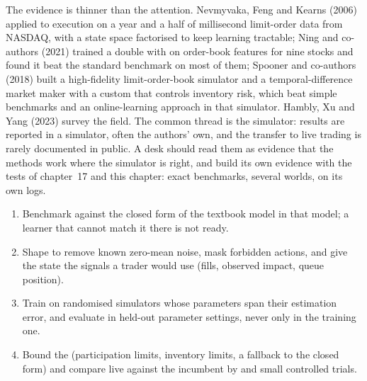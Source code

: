 The evidence is thinner than the attention. Nevmyvaka, Feng and Kearns (2006) applied  to execution on
a year and a half of millisecond limit-order data from NASDAQ, with a state space factorised to keep learning tractable;
Ning and co-authors (2021) trained a double  with  on order-book features for nine stocks and
found it beat the standard benchmark on most of them; Spooner and co-authors
(2018) built a high-fidelity limit-order-book simulator and a temporal-difference market maker with a custom  that
controls inventory risk, which beat simple benchmarks and an online-learning approach in that simulator. Hambly, Xu and Yang
(2023) survey the field. The common thread is the simulator: results are reported in a simulator, often the authors' own, and
the transfer to live trading is rarely documented in public. A desk should read them as evidence that the methods work where
the simulator is right, and build its own evidence with the tests of chapter~17 and this chapter: exact benchmarks, several
worlds,  on its own logs.

\begin{method}\label{met:ml:rlt:method}
\begin{enumerate}
\item Benchmark against the closed form of the textbook model in that model; a learner that cannot match it there is not
ready.
\item Shape  to remove known zero-mean noise, mask forbidden actions, and give the state the signals a trader would
use (fills, observed impact, queue position).
\item Train on randomised simulators whose parameters span their estimation error, and evaluate in held-out parameter
settings, never only in the training one.
\item Bound the  (participation limits, inventory limits, a fallback to the closed form) and compare live against the
incumbent by  and small controlled trials.
\end{enumerate}
\end{method}

